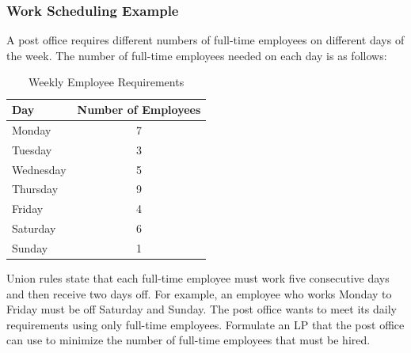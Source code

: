\documentclass{beamer}
\begin{document}
\begin{frame}[shrink]\frametitle{Work Scheduling Example}
A post office requires different numbers of full-time 
employees on different days of the week.  The number of 
full-time employees needed on each day is as follows:

{\small\begin{table}[h]
    \centering
    \begin{tabular}{lc}
        \toprule
        Day & Number of Employees \\
        \midrule
        Monday & 7 \\
        Tuesday & 3 \\
        Wednesday & 5 \\
        Thursday & 9 \\
        Friday & 4 \\
        Saturday & 6 \\
        Sunday & 1 \\
        \bottomrule
    \end{tabular}
    \caption{Weekly Employee Requirements}
    \label{tab:employee_requirements}
\end{table}}


Union rules state that each full-time employee must work 
five consecutive days and then receive two days off.  For 
example, an employee who works Monday to Friday 
must be off Saturday and Sunday.  The post office wants 
to meet its daily requirements using only full-time 
employees.  Formulate an LP that the post office can use 
to minimize the number of full-time employees that must 
be hired.
\end{frame}
\end{document}
